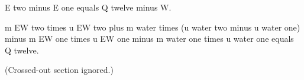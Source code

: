 E two minus E one equals Q twelve minus W.  

m EW two times u EW two plus m water times (u water two minus u water one) minus m EW one times u EW one minus m water one times u water one equals Q twelve.  

(Crossed-out section ignored.)